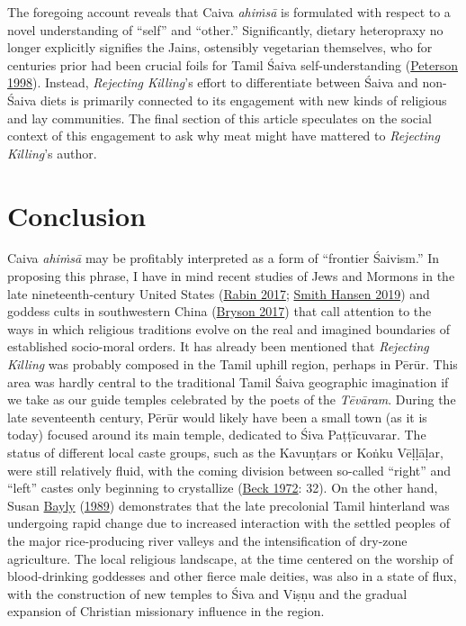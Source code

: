 The foregoing account reveals that Caiva \emph{ahiṁsā} is formulated with respect to a novel understanding of “self” and “other.” Significantly, dietary heteropraxy no longer explicitly signifies the Jains, ostensibly vegetarian themselves, who for centuries prior had been crucial foils for Tamil Śaiva self-understanding (\hyperref[Peterson1998]{Peterson 1998}). Instead, \emph{Rejecting Killing}’s effort to differentiate between Śaiva and non-Śaiva diets is primarily connected to its engagement with new kinds of religious and lay communities. The final section of this article speculates on the social context of this engagement to ask why meat might have mattered to \emph{Rejecting Killing}’s author.

\section{Conclusion}
      Caiva \emph{ahiṁsā} may be profitably interpreted as a form of “frontier Śaivism.” In proposing this phrase, I have in mind recent studies of Jews and Mormons in the late nineteenth-century United States (\hyperref[Rabin2017]{Rabin 2017}; \hyperref[SmithHansen2019]{Smith Hansen 2019}) and goddess cults in southwestern China (\hyperref[Bryson2017]{Bryson 2017}) that call attention to the ways in which religious traditions evolve on the real and imagined boundaries of established socio-moral orders. It has already been mentioned that \emph{Rejecting Killing} was probably composed in the Tamil uphill region, perhaps in Pērūr. This area was hardly central to the traditional Tamil Śaiva geographic imagination if we take as our guide temples celebrated by the poets of the \emph{{Tēvāram}}. During the late seventeenth century, Pērūr would likely have been a small town (as it is today) focused around its main temple, dedicated to Śiva Paṭṭīcuvarar. The status of different local caste groups, such as the Kavuṇṭars or Koṅku Vēḷḷāḷar, were still relatively fluid, with the coming division between so-called “right” and “left” castes only beginning to crystallize (\hyperref[Beck1972]{Beck 1972}: 32). On the other hand, Susan \hyperref[Bayly1989]{Bayly} (\hyperref[Bayly1989]{1989}) demonstrates that the late precolonial Tamil hinterland was undergoing rapid change due to increased interaction with the settled peoples of the major rice-producing river valleys and the intensification of dry-zone agriculture. The local religious landscape, at the time centered on the worship of blood-drinking goddesses and other fierce male deities, was also in a state of flux, with the construction of new temples to Śiva and Viṣṇu and the gradual expansion of Christian missionary influence in the region. 


